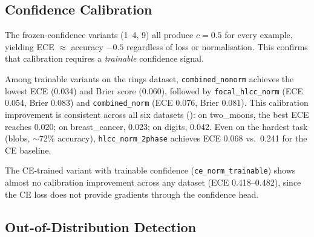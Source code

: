 \documentclass[11pt,a4paper]{article}
\begin{document}
\subsection{Confidence Calibration}

The frozen-confidence variants (1--4, 9) all produce $c = 0.5$ for
every example, yielding ECE $\approx$ accuracy $- 0.5$
regardless of loss or normalisation.  This confirms that calibration
requires a \emph{trainable} confidence signal.

Among trainable variants on the rings dataset, \texttt{combined\_nonorm}
achieves the lowest ECE (0.034) and Brier score (0.060), followed by
\texttt{focal\_hlcc\_norm} (ECE 0.054, Brier 0.083) and
\texttt{combined\_norm} (ECE 0.076, Brier 0.081).  This calibration
improvement is consistent across all six datasets
(): on two\_moons, the best ECE reaches 0.020; on
breast\_cancer, 0.023; on digits, 0.042.  Even on the hardest task
(blobs, $\sim$72\% accuracy), \texttt{hlcc\_norm\_2phase} achieves
ECE 0.068 vs.\ 0.241 for the CE baseline.

The CE-trained variant with trainable confidence
(\texttt{ce\_norm\_trainable}) shows almost no calibration
improvement across any dataset (ECE 0.418--0.482), since the CE loss
does not provide gradients through the confidence head.


\subsection{Out-of-Distribution Detection}
\end{document}
